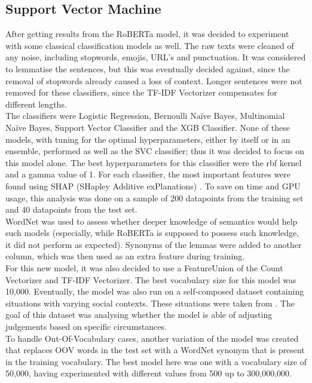 \documentclass[final]{clv3} %
\begin{document}
\subsection{Support Vector Machine}

After getting results from the RoBERTa model, it was decided to experiment with some classical classification models as well. The raw texts were cleaned of any noise, including stopwords, emojis, URL’s and punctuation. It was considered to lemmatise the sentences, but this was eventually decided against, since the removal of stopwords already caused a loss of context. Longer sentences were not removed for these classifiers, since the TF-IDF Vectorizer compensates for different lengths.\\

The classifiers were Logistic Regression, Bernoulli Naïve Bayes, Multinomial Naïve Bayes, Support Vector Classifier and the XGB Classifier. None of these models, with tuning for the optimal hyperparameters, either by itself or in an ensemble, performed as well as the SVC classifier; thus it was decided to focus on this model alone. The best hyperparameters for this classifier were the rbf kernel and a gamma value of 1. For each classifier, the most important features were found using SHAP (SHapley Additive exPlanations) \cite{shap}. To save on time and GPU usage, this analysis was done on a sample of 200 datapoints from the training set and 40 datapoints from the test set. \\

WordNet \cite{miller} was used to assess whether deeper knowledge of semantics would help such models (especially, while RoBERTa is supposed to possess such knowledge, it did not perform as expected). Synonyms of the lemmas were added to another column, which was then used as an extra feature during training. \\

For this new model, it was also decided to use a FeatureUnion of the Count Vectorizer and TF-IDF Vectorizer. The best vocabulary size for this model was 10,000. Eventually, the model was also run on a self-composed dataset containing situations with varying social contexts. These situations were taken from \citet{jiang}. The goal of this dataset was analysing whether the model is able of adjusting judgements based on specific circumstances.\\

To handle Out-Of-Vocabulary cases, another variation of the model was created that replaces OOV words in the test set with a WordNet synonym that is present in the training vocabulary. The best model here was one with a vocabulary size of 50,000, having experimented with different values from 500 up to 300,000,000.
\end{document}
